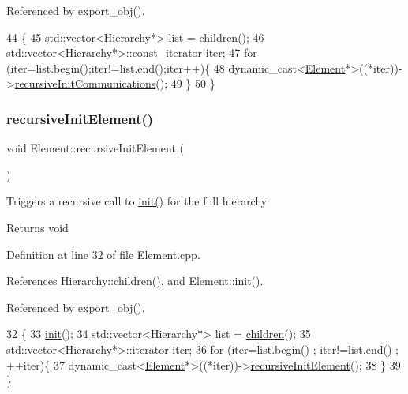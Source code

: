 Referenced by export\+\_\+obj().


\begin{DoxyCode}
44                                          \{
45   std::vector<Hierarchy*> list = \hyperlink{classHierarchy_aa9a76f69e98e052ee1a6e32cea006288}{children}();
46   std::vector<Hierarchy*>::const\_iterator iter;
47   \textcolor{keywordflow}{for} (iter=list.begin();iter!=list.end();iter++)\{
48     \textcolor{keyword}{dynamic\_cast<}\hyperlink{classElement}{Element}*\textcolor{keyword}{>}((*iter))->\hyperlink{classElement_a82119ed37dff76508a2746a853ec35ba}{recursiveInitCommunications}();
49   \}
50 \}
\end{DoxyCode}
\mbox{\label{classElement_a3c0abcb36f8906688bb7e32608df7086}} 
\subsubsection{\texorpdfstring{recursive\+Init\+Element()}{recursiveInitElement()}}
{\footnotesize\ttfamily void Element\+::recursive\+Init\+Element (\begin{DoxyParamCaption}{ }\end{DoxyParamCaption})\hspace{0.3cm}{\ttfamily [inherited]}}

Triggers a recursive call to \hyperlink{structInterfaceWrap_a2660ecdfbabd91d99d7b64c83e92f33c}{init()} for the full hierarchy

\begin{DoxyReturn}{Returns}
void 
\end{DoxyReturn}


Definition at line 32 of file Element.\+cpp.



References Hierarchy\+::children(), and Element\+::init().



Referenced by export\+\_\+obj().


\begin{DoxyCode}
32                                   \{
33   \hyperlink{classElement_af42754b5cabc198869222725218d695c}{init}();
34   std::vector<Hierarchy*> list = \hyperlink{classHierarchy_aa9a76f69e98e052ee1a6e32cea006288}{children}();
35   std::vector<Hierarchy*>::iterator iter;
36   \textcolor{keywordflow}{for} (iter=list.begin() ; iter!=list.end() ; ++iter)\{
37     \textcolor{keyword}{dynamic\_cast<}\hyperlink{classElement}{Element}*\textcolor{keyword}{>}((*iter))->\hyperlink{classElement_a3c0abcb36f8906688bb7e32608df7086}{recursiveInitElement}();
38   \}
39 \}
\end{DoxyCode}
\mbox{\label{classAttrib_a7d4ef7e32d93cb287792b87b857e79f3}} 
